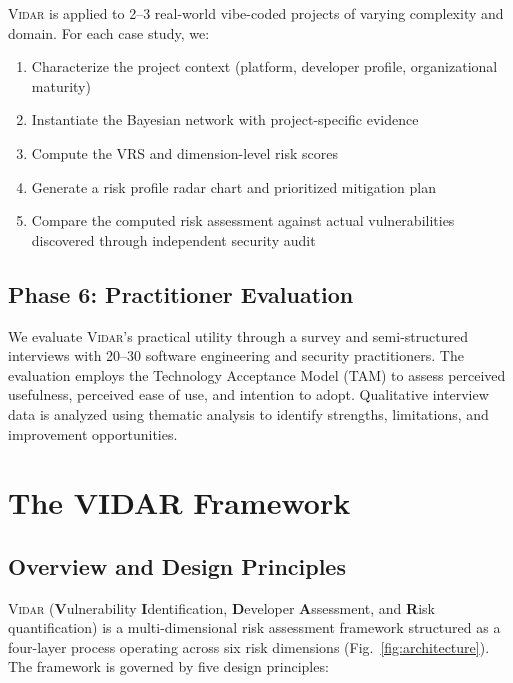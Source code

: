 \documentclass[preprint,review,12pt]{elsarticle}
\newcommand{\vidar}{\textsc{Vidar}}
\begin{document}
\vidar{} is applied to 2--3 real-world vibe-coded projects of varying complexity and domain. For each case study, we:
\begin{enumerate}
    \item Characterize the project context (platform, developer profile, organizational maturity)
    \item Instantiate the Bayesian network with project-specific evidence
    \item Compute the VRS and dimension-level risk scores
    \item Generate a risk profile radar chart and prioritized mitigation plan
    \item Compare the computed risk assessment against actual vulnerabilities discovered through independent security audit
\end{enumerate}


\subsection{Phase 6: Practitioner Evaluation}
\label{subsec:phase6}

We evaluate \vidar{}'s practical utility through a survey and semi-structured interviews with 20--30 software engineering and security practitioners. The evaluation employs the Technology Acceptance Model (TAM) \cite{davis1989tam} to assess perceived usefulness, perceived ease of use, and intention to adopt. Qualitative interview data is analyzed using thematic analysis to identify strengths, limitations, and improvement opportunities.


\section{The VIDAR Framework}
\label{sec:framework}

\subsection{Overview and Design Principles}
\label{subsec:overview}

\vidar{} (\textbf{V}ulnerability \textbf{I}dentification, \textbf{D}eveloper \textbf{A}ssessment, and \textbf{R}isk quantification) is a multi-dimensional risk assessment framework structured as a four-layer process operating across six risk dimensions (Fig.~\ref{fig:architecture}). The framework is governed by five design principles:
\end{document}
